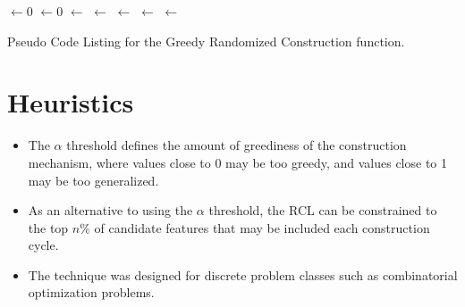 \documentclass[a4paper, 11pt]{article}
\begin{document}
\begin{algorithm}[ht]
	\SetLine

	\KwIn{\Alpha}
	\KwOut{\Candidate}
	\Candidate $\leftarrow 0$\;
	\While{\Candidate $\neq$ \ProblemSize} {
		\FeatureCosts $\leftarrow 0$\;
		\For{\ProblemFeature $\notin$ \Candidate}{
			\FeatureCosts $\leftarrow$ \CostImpactOfFeature{\Candidate, \ProblemFeature}\;
		}
		\ProblemFeatureMinCost $\leftarrow$ \MinCost{\FeatureCosts}\;
		\ProblemFeatureMaxCost $\leftarrow$ \MaxCost{\FeatureCosts}\;
		\For{\ProblemFeatureCost $\in$ \FeatureCosts} {
			\If{\ProblemFeature $\leq$ $\ProblemFeatureMinCost + \alpha \cdot (\ProblemFeatureMaxCost - \ProblemFeatureMinCost)$ } {
				\RCL $\leftarrow$ \ProblemFeature\;
			}
		}
		\SelectedFeature $\leftarrow$ \SelectRandomFeature{\RCL}\;
		\Candidate $\leftarrow$ \SelectedFeature\;
	}
	\Return{\Candidate}\;
	\caption{Pseudo Code Listing for the Greedy Randomized Construction function.}
	\label{alg:construction}
\end{algorithm}


\section{Heuristics}
\label{sec:heuristics}
\begin{itemize}
	\item The $\alpha$ threshold defines the amount of greediness of the construction mechanism, where values close to 0 may be too greedy, and values close to 1 may be too generalized.
	\item As an alternative to using the $\alpha$ threshold, the RCL can be constrained to the top $n\%$ of candidate features that may be included each construction cycle.
	\item The technique was designed for discrete problem classes such as combinatorial optimization problems.
\end{itemize}
\end{document}
